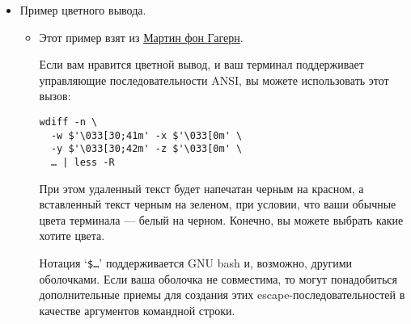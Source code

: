 \begin{itemize}
\begin{itemize}
    Использование \texttt{wdiff} с некоторыми специфичными для
    \texttt{troff} разделителями дает \emph{намного} лучший результат.
    Разделители, которые я использовал:

\begin{verbatim}
wdiff -w'\s-5' -x'\s0' -y'\fB' -z'\fP' …
\end{verbatim}

    Это делает размер удалений на 5 пунктов меньше, чем обычно, и
    выделяет полужирным вставки. Фантастика!

    Я экспериментировал с:

\begin{verbatim}
wdiff -w'\fI' -x'\fP' -y'\fB' -z'\fP'
\end{verbatim}

    поскольку это больше похоже на значения по умолчанию, которые
    используются для терминалов или принтеров, но поскольку я сам
    использую курсив для выделения в своих документах, я подумал, что
    размер шрифта делает это был более понятным.

    Я попробовал это с кодом и команда работаетработает на удивление
    хорошо...
  \item
    \href{mailto:leisner@eso.mc.xerox.com}{Марти Лейснер} говорит:

    В предыдущем примере у вас был удален меньший текст и вставлен
    жирный шрифт. У меня был удаленный текст имеет меньший размер, а
    вставленны более крупный - я использую жирный шрифт для других вещей
    - это более понятно.

\begin{verbatim}
wdiff -w '\s-3' -x'\s0' -y'\s+3' -z'\s0'
\end{verbatim}
  \end{itemize}
\item
  Пример цветного вывода.

  \begin{itemize}
  \item
    Этот пример взят из \href{mailto:Martin.vGagern@gmx.net}{Мартин фон
    Гагерн}.

    Если вам нравится цветной вывод, и ваш терминал поддерживает
    управляющие последовательности ANSI, вы можете использовать этот
    вызов:

\begin{verbatim}
wdiff -n \
  -w $'\033[30;41m' -x $'\033[0m' \
  -y $'\033[30;42m' -z $'\033[0m' \
  … | less -R
\end{verbatim}

    При этом удаленный текст будет напечатан черным на красном, а
    вставленный текст черным на зеленом, при условии, что ваши обычные
    цвета терминала --- белый на черном. Конечно, вы можете выбрать
    какие хотите цвета.

    Нотация `\texttt{\$\textquotesingle{}\ldots{}\textquotesingle{}}'
    поддерживается GNU bash и, возможно, другими оболочками. Если ваша
    оболочка не совместима, то могут понадобиться дополнительные приемы
    для создания этих escape-последовательностей в качестве аргументов
    командной строки.
  \end{itemize}
\end{itemize}

